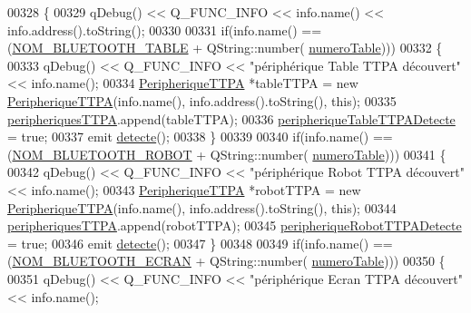 \begin{DoxyCode}
00328 \{
00329     qDebug() << Q\_FUNC\_INFO << info.name() << info.address().toString();
00330 
00331     \textcolor{keywordflow}{if}(info.name() == (\hyperlink{terminal-_t_t_p_a_2communicationbluetooth_8h_aa416b2be7573de0d7832248a27ba09a8}{NOM\_BLUETOOTH\_TABLE} + QString::number(
      \hyperlink{class_communication_bluetooth_a9428f8261f0cc055e9c6fed9a61cb595}{numeroTable})))
00332     \{
00333         qDebug() << Q\_FUNC\_INFO << \textcolor{stringliteral}{"périphérique Table TTPA découvert"} << info.name();
00334         \hyperlink{class_peripherique_t_t_p_a}{PeripheriqueTTPA} *tableTTPA = \textcolor{keyword}{new} \hyperlink{class_peripherique_t_t_p_a}{PeripheriqueTTPA}(info.name(), 
      info.address().toString(), \textcolor{keyword}{this});
00335         \hyperlink{class_communication_bluetooth_a656a80f8216d2a4db7cf2f865365e562}{peripheriquesTTPA}.append(tableTTPA);
00336         \hyperlink{class_communication_bluetooth_a1b4f8cfa7d15ede41c4a6f5c9521e955}{peripheriqueTableTTPADetecte} = \textcolor{keyword}{true};
00337         emit \hyperlink{class_communication_bluetooth_a27ecb0427e1d2a6c936294e8a68e511f}{detecte}();
00338     \}
00339 
00340     \textcolor{keywordflow}{if}(info.name() == (\hyperlink{terminal-_t_t_p_a_2communicationbluetooth_8h_a47332bb9b30ed8b0f38fa7b5bd11fd47}{NOM\_BLUETOOTH\_ROBOT} + QString::number(
      \hyperlink{class_communication_bluetooth_a9428f8261f0cc055e9c6fed9a61cb595}{numeroTable})))
00341     \{
00342         qDebug() << Q\_FUNC\_INFO << \textcolor{stringliteral}{"périphérique Robot TTPA découvert"} << info.name();
00343         \hyperlink{class_peripherique_t_t_p_a}{PeripheriqueTTPA} *robotTTPA = \textcolor{keyword}{new} \hyperlink{class_peripherique_t_t_p_a}{PeripheriqueTTPA}(info.name(), 
      info.address().toString(), \textcolor{keyword}{this});
00344         \hyperlink{class_communication_bluetooth_a656a80f8216d2a4db7cf2f865365e562}{peripheriquesTTPA}.append(robotTTPA);
00345         \hyperlink{class_communication_bluetooth_ac4bf43e3da4748c8fa25e0ac1d3cf849}{peripheriqueRobotTTPADetecte} = \textcolor{keyword}{true};
00346         emit \hyperlink{class_communication_bluetooth_a27ecb0427e1d2a6c936294e8a68e511f}{detecte}();
00347     \}
00348 
00349     \textcolor{keywordflow}{if}(info.name() == (\hyperlink{terminal-_t_t_p_a_2communicationbluetooth_8h_a2bd8beaaf0c4b59979a3f78d4c134ec8}{NOM\_BLUETOOTH\_ECRAN} + QString::number(
      \hyperlink{class_communication_bluetooth_a9428f8261f0cc055e9c6fed9a61cb595}{numeroTable})))
00350     \{
00351         qDebug() << Q\_FUNC\_INFO << \textcolor{stringliteral}{"périphérique Ecran TTPA découvert"} << info.name();

\end{DoxyCode}
